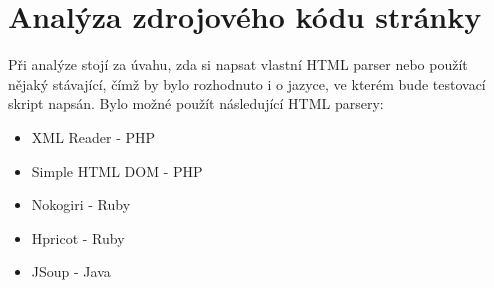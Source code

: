 \section{Analýza zdrojového kódu stránky}
Při analýze stojí za úvahu, zda si napsat vlastní HTML parser nebo použít nějaký stávající, čímž by bylo rozhodnuto i o jazyce, ve kterém bude testovací skript napsán. Bylo možné použít  následující HTML parsery:
\begin{itemize}
\item XML Reader - PHP
\item Simple HTML DOM - PHP
\item Nokogiri - Ruby
\item Hpricot - Ruby
\item JSoup - Java
\end{itemize}

